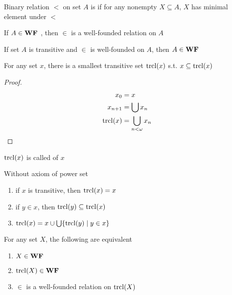 \documentclass[11pt]{article}
\begin{document}

\begin{definition}[]
Binary relation \(<\) on set \(A\) is  if for any nonempty
\(X\subseteq A\), \(X\) has minimal element under \(<\)
\end{definition}


\begin{theorem}[]
If \(A\in\textbf{WF }\), then \(\in\) is a well-founded relation on \(A\)
\end{theorem}

\begin{lemma}[]
If set \(A\) is transitive and \(\in\) is well-founded on \(A\), then \(A\in\textbf{WF }\)
\end{lemma}

\begin{lemma}[]
For any set \(x\), there is a smallest transitive set \(\mathrm{trcl}{(x)}\) s.t.
\(x\subseteq\mathrm{trcl}{(x)}\) 
\end{lemma}

\begin{proof}
\begin{align*}
x_0&=x\\
x_{n+1}&=\bigcup x_n\\
\mathrm{trcl}{(x)}&=\displaystyle\bigcup_{n<\omega}x_n
\end{align*}
\end{proof}

\(\mathrm{trcl}{(x)}\) is called  of \(x\)


\begin{lemma}[]
Without axiom of power set
\begin{enumerate}
\item if \(x\) is transitive, then \(\mathrm{trcl}{(x)}=x\)
\item if \(y\in x\), then \(\mathrm{trcl}{(y)}\subseteq\mathrm{trcl}{(x)}\)
\item \(\mathrm{trcl}{(x)}=x\cup\bigcup\{\mathrm{trcl}{(y)}\mid y\in x\}\)
\end{enumerate}
\end{lemma}

\begin{theorem}[]
For any set \(X\), the following are equivalent
\begin{enumerate}
\item \(X\in\textbf{WF }\)
\item \(\mathrm{trcl}{(X)}\in\textbf{WF }\)
\item \(\in\) is a well-founded relation on \(\mathrm{trcl}{(X)}\)
\end{enumerate}
\end{theorem}
\end{document}
